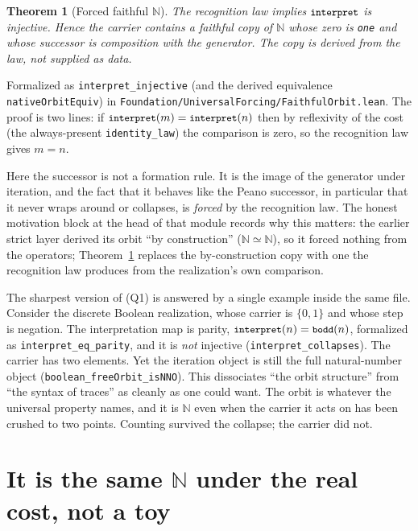 \documentclass[11pt,a4paper]{article}
\newtheorem{theorem}{Theorem}[section]
\theoremstyle{definition}
\theoremstyle{remark}
\newcommand{\code}[1]{\texttt{\small #1}}
\begin{document}
\begin{theorem}[Forced faithful $\mathbb{N}$]\label{thm:faithful}
The recognition law implies $\code{interpret}$ is injective. Hence the carrier
contains a faithful copy of $\mathbb{N}$ whose zero is \code{one} and whose
successor is composition with the generator. The copy is derived from the law,
not supplied as data.
\end{theorem}

Formalized as \code{interpret\_injective} (and the derived equivalence
\code{nativeOrbitEquiv}) in \code{Foundation/UniversalForcing/FaithfulOrbit.lean}.
The proof is two lines: if $\code{interpret}(m) = \code{interpret}(n)$ then by
reflexivity of the cost (the always-present \code{identity\_law}) the comparison
is zero, so the recognition law gives $m=n$.

Here the successor is not a formation rule. It is the image of the generator
under iteration, and the fact that it behaves like the Peano successor, in
particular that it never wraps around or collapses, is \emph{forced} by the
recognition law. The honest motivation block at the head of that module records
why this matters: the earlier strict layer derived its orbit ``by construction''
($\mathbb{N} \simeq \mathbb{N}$), so it forced nothing from the operators;
Theorem~\ref{thm:faithful} replaces the by-construction copy with one the
recognition law produces from the realization's own comparison.

The sharpest version of (Q1) is answered by a single example inside the same
file. Consider the discrete Boolean realization, whose carrier is $\{0,1\}$ and
whose step is negation. The interpretation map is parity,
$\code{interpret}(n) = \code{bodd}(n)$, formalized as \code{interpret\_eq\_parity},
and it is \emph{not} injective (\code{interpret\_collapses}). The carrier has two
elements. Yet the iteration object is still the full natural-number object
(\code{boolean\_freeOrbit\_isNNO}). This dissociates ``the orbit structure'' from
``the syntax of traces'' as cleanly as one could want. The orbit is whatever the
universal property names, and it is $\mathbb{N}$ even when the carrier it acts on
has been crushed to two points. Counting survived the collapse; the carrier did
not.

\section{It is the same $\mathbb{N}$ under the real cost, not a toy}\label{sec:jcost}
\end{document}
